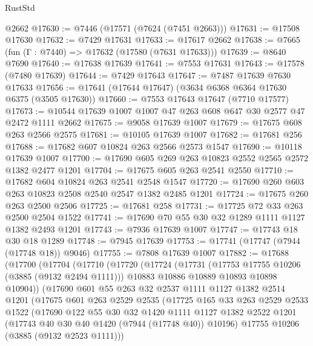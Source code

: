 \begin{lexlean}{RustStd}
\begin{coremodule}
    @2662
@17630 := @7446 (@17571 (@7624 (@7451 @2663)))
@17631 := @17508 @17630
@17632 := @7429 @17631
@17633 := @17617 @2662
@17638 := @7665 (fun (Γ : @7440) => @17632 (@17580 (@7631 @17633)))
@17639 := @8640 @7690
@17640 := @17638 @17639
@17641 := @7553 @17631
@17643 := @17578 (@7480 @17639)
@17644 := @7429 @17643
@17647 := @7487 @17639 @7630 @17633
@17656 := @17641 (@17644 @17647) (@3634 @6368 @6364 @17630 @6375 (@3505 @17630))
@17660 := @7553 @17643 @17647 (@7710 @17577)
@17673 := @10544 @17639 @1007 @1007 @47 @263 @608 @647 @30 @2577 @47 @2472 @1111 @2662
@17675 := @9058 @17639 @1007
@17679 := @17675 @608 @263 @2566 @2575
@17681 := @10105 @17639 @1007
@17682 := @17681 @256
@17688 := @17682 @607 @10824 @263 @2566 @2573 @1547
@17690 := @10118 @17639 @1007
@17700 := @17690 @605 @269 @263 @10823 @2552 @2565 @2572 @1382 @2477 @1201
@17704 := @17675 @605 @263 @2541 @2550
@17710 := @17682 @604 @10824 @263 @2541 @2548 @1547
@17720 := @17690 @260 @603 @263 @10823 @2508 @2540 @2547 @1382 @2485 @1201
@17724 := @17675 @260 @263 @2500 @2506
@17725 := @17681 @258
@17731 := @17725 @72 @33 @263 @2500 @2504 @1522
@17741 := @17690 @70 @55 @30 @32 @1289 @1111 @1127 @1382 @2493 @1201
@17743 := @7936 @17639 @1007
@17747 := @17743 @18 @30 @18 @1289
@17748 := @7945 @17639
@17753 := @17741 (@17747 (@7944 (@17748 @18)) @9046)
@17755 := @7808 @17639 @1007
@17882 := @17688
    (@17700
      (@17704
        (@17710
          (@17720
            (@17724
              (@17731
                (@17753 @17755 @10206 (@3885 (@9132 @2494 @1111)))
                @10883
                @10886
                @10889
                @10893
                @10898
                @10904))
            (@17690
              @601
              @55
              @263
              @32
              @2537
              @1111
              @1127
              @1382
              @2514
              @1201
              (@17675
                @601
                @263
                @2529
                @2535
                (@17725
                  @165
                  @33
                  @263
                  @2529
                  @2533
                  @1522
                  (@17690
                    @122
                    @55
                    @30
                    @32
                    @1420
                    @1111
                    @1127
                    @1382
                    @2522
                    @1201
                    (@17743 @40 @30 @40 @1420 (@7944 (@17748 @40)) @10196)
                    @17755
                    @10206
                    (@3885 (@9132 @2523 @1111)))

\end{coremodule}
\end{lexlean}
